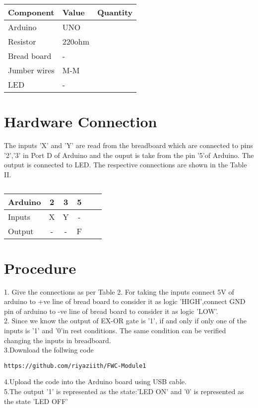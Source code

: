 \documentclass{IEEEtran}
\begin{document}
     \begin{tabularx}{0.4\textwidth} {  
  | >{\centering\arraybackslash}X  
  | >{\centering\arraybackslash}X  
  | >{\centering\arraybackslash}X |}
  \hline
\textbf{Component} &  \textbf{Value} & \textbf{Quantity}\\
\hline
Arduino & UNO & 1 \\  
\hline
Resistor& 220ohm & 1 \\ 
\hline
Bread board & - & 1 \\
\hline
Jumber wires & M-M & 20\\
\hline
LED & - & 1\\
\hline
\end{tabularx}

     
  \section{Hardware Connection}
  The inputs 'X' and 'Y' are read from the breadboard which are connected to pins '2','3' in Port D of Arduino and the ouput is take from the pin '5'of Arduino. The output is connected to LED. The respective connections are shown in the Table II.
	 \begin{table}[htbp]
 \begin{center}
    \begin{tabular}{|l|c|c|c|c|c|} \hline 
  \textbf{Arduino}& \textbf{2} & \textbf{3}&\textbf{5}\\
   \hline
 Inputs&X&Y&-\\ \hline
 Output&-&-&F\\ \hline
\end{tabular}   
\end{center}
\caption{\label{table:dummytable} }
\end{table}


	\section{Procedure}

1. Give the connections as per Table 2. For taking the inputs connect 5V of arduino to +ve line of bread board to consider it as logic 'HIGH',connect GND pin of arduino to -ve line of bread board to consider it as logic 'LOW'.
\\2. Since we know the output of EX-OR gate is '1', if and only if only one of the inputs is '1' and '0'in rest conditions. The same condition can be verified changing the inputs in breadboard.
\\3.Download the follwing code
\begin{lstlisting}
https://github.com/riyaziith/FWC-Module1
\end{lstlisting}
 4.Upload the code into the Arduino board using USB cable.
\\5.The output '1' is represented as the state:'LED ON' and '0' is represented as the state 'LED OFF'
\end{document}
